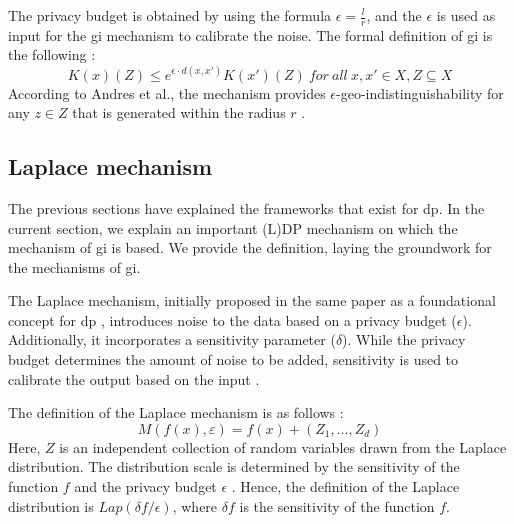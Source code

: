 The privacy budget is obtained by using the formula $\epsilon = \frac{l}{r}$, and the $\epsilon$ is used as input for the \gls{gi} mechanism to calibrate the noise. \newline
The formal definition of \gls{gi} is the following \citep{DBLP:journals/corr/abs-1212-1984}:
\begin{equation}
  K(x)(Z) \le e^{\epsilon \cdot d(x,x')} K(x')(Z) \ for \ all \ x,x' \in X, Z \subseteq X 
  \label{algo:2d-geo-indistinguishability}
\end{equation}
According to Andres et al., the mechanism provides $\epsilon$-geo-indistinguishability for any $z \in Z$ that is generated within the radius $r$ \citep{DBLP:journals/corr/abs-1212-1984}.
\subsection{Laplace mechanism} \label{theory:laplace}
The previous sections have explained the frameworks that exist for \gls{dp}.
In the current section, we explain an important (L)DP mechanism on which the mechanism of \gls{gi} is based.
We provide the definition, laying the groundwork for the mechanisms of \gls{gi}.

The Laplace mechanism, initially proposed in the same paper as a foundational concept for \gls{dp} \citep{dwork_differential_2006},
introduces noise to the data based on a privacy budget ($\epsilon$).
Additionally, it incorporates a sensitivity parameter ($\delta$).
While the privacy budget determines the amount of noise to be added, sensitivity is used to calibrate the output based on the input \citep{del_rey_comprehensive_2020}.

The definition of the Laplace mechanism is as follows \citep{del_rey_comprehensive_2020}:
\begin{equation}
  M\left(f\left(x\right),\varepsilon\right)=f\left(x\right)+\left(Z_{1},\ldots,Z_{d}\right)
\end{equation}
Here, $Z$ is an independent collection of random variables drawn from the Laplace distribution.
The distribution scale is determined by the sensitivity of the function $f$ and the privacy budget $\epsilon$ \citep{del_rey_comprehensive_2020}.
Hence, the definition of the Laplace distribution is $Lap(\delta f/\epsilon)$, where $\delta f$ is the sensitivity of the function $f$. \newline

